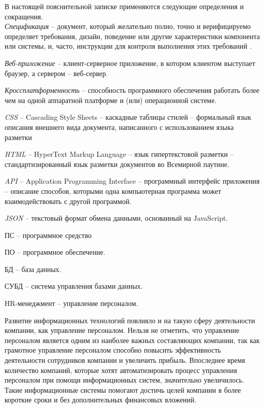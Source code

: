 \label{sec:definitions}

В настоящей пояснительной записке применяются следующие определения и сокращения.
\\

\emph{Спецификация} -- документ, который желательно полно, точно и верифицируемо определяет требования, дизайн,
поведение или другие характеристики компонента или системы, и, часто, инструкции для контроля выполнения этих
требований \cite{istqb_specification}.

\emph{Веб-приложение} -- клиент-серверное приложение, в котором клиентом выступает браузер, а сервером – веб-сервер.

\emph{Кроссплатформенность} -- способность программного обеспечения работать более чем на одной аппаратной платформе и (или) операционной системе.

\emph{CSS} -- Cascading Style Sheets -- каскадные таблицы стилей -- формальный язык описания внешнего вида документа,
написанного с использованием языка разметки

\emph{HTML} -- HyperText Markup Language -- язык гипертекстовой разметки -- стандартизированный язык разметки документов
во Всемирной паутине.

\emph{API} -- Application Programming Interface -- программный интерфейс приложения -- описание способов, которыми одна компьютерная программа может
взаимодействовать с другой программой.

\emph{JSON} -- текстовый формат обмена данными, основанный на JavaScript.

ПС -- программное средство

ПО -- программное обеспечение.

БД -- база данных.

СУБД -- система управления базами данных.

HR-менеджмент -- управление персоналом.
\\

\label{sec:introduction}
 
Развитие информационных технологий повлияло и на такую сферу деятельности компании, как управление персоналом.
Нельзя не отметить, что управление персоналом является одним из наиболее важных составляющих компании, так как
грамотное управление персоналом способно повысить эффективность деятельности сотрудников компании и увеличить
прибыль. Впоследнее время количество компаний, которые хотят автоматизировать процесс управления персоналом при помощи
информационных систем, значительно увеличилось. Такие информационные системы помогают достичь целей компании в более
короткие сроки и без дополнительных финансовых вложений.

